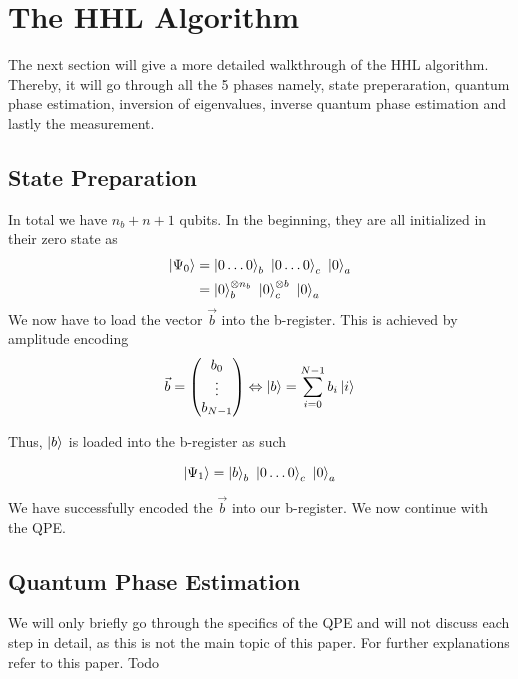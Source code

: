 \section{The HHL Algorithm}
The next section will give a more detailed walkthrough of the HHL algorithm.
Thereby, it will go through all the 5 phases namely, state preperaration, quantum phase estimation, inversion of eigenvalues, inverse quantum phase estimation and lastly the measurement.

\subsection{State Preparation}

In total we have $n_b + n + 1$ qubits. 
In the beginning, they are all initialized in their zero state as
\begin{equation}
\begin{split}
\ket{\Psi_0} &= \ket{0\dots0}_b\ \ket{0\dots0}_c\ \ket{0}_a \\
&= \ket{0}_b^{{\otimes n_b}}\ \ket{0}_c^{\otimes b}\ \ket{0}_a 
\end{split}
\end{equation}
We now have to load the vector $\vec{b}$ into the b-register. 
This is achieved by amplitude encoding
\begin{equation}
    \vec{b} = \begin{pmatrix} b_0\\ \vdots \\ b_{N-1} \end{pmatrix} 
    \Leftrightarrow  
     \ket b = \sum_{i=0}^{N-1} b_i \ket i
\end{equation}

Thus, $\ket b$ is loaded into the b-register as such

\begin{equation}
\ket{\Psi_1} = \ket{b}_b\ \ket{0\dots0}_c\ \ket{0}_a
\end{equation}

We have successfully encoded the $\vec{b}$ into our b-register. 
We now continue with the QPE. 

\subsection{Quantum Phase Estimation}
We will only briefly go through the specifics of the QPE and will not discuss each step in detail, as this is not the main topic of this paper. 
For further explanations refer to this paper.
Todo

